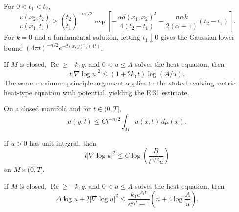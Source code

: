 \begin{theorem}
\label{thm:chow-ii-path-harnack}


For $0<t_1<t_2$,
\[
\frac{u(x_2,t_2)}{u(x_1,t_1)}\ge
\left(\frac{t_2}{t_1}\right)^{-\alpha n/2}
\exp\left[-\frac{\alpha d(x_1,x_2)^2}{4(t_2-t_1)}
-\frac{n\alpha k}{2(\alpha-1)}(t_2-t_1)\right].
\]
For $k=0$ and a fundamental solution, letting $t_1\downarrow0$ gives the
Gaussian lower bound $(4\pi t)^{-n/2}e^{-d(x,y)^2/(4t)}$.
\end{theorem}

\begin{theorem}
\label{thm:chow-ii-hamilton-gradient-estimate}

If $M$ is closed, $\operatorname{Rc}\ge-k_1g$, and $0<u\le A$ solves the
heat equation, then
\[
t|\nabla\log u|^2\le(1+2k_1t)\log(A/u).
\]
The same maximum-principle argument applies to the stated evolving-metric
heat-type equation with potential, yielding the E.31 estimate.
\end{theorem}

\begin{corollary}
\label{cor:chow-ii-heat-integral-pointwise}


On a closed manifold and for $t\in(0,T]$,
\[
u(y,t)\le Ct^{-n/2}\int_Mu(x,t)\,d\mu(x).
\]
\end{corollary}

\begin{corollary}
\label{cor:chow-ii-heat-gradient-integral}


If $u>0$ has unit integral, then
\[
t|\nabla\log u|^2\le C\log\left(\frac{B}{t^{n/2}u}\right)
\]
on $M\times(0,T]$.
\end{corollary}

\begin{theorem}
\label{thm:chow-ii-heat-laplacian-estimate}

If $M$ is closed, $\operatorname{Rc}\ge-k_1g$, and $0<u\le A$ solves the heat
equation, then
\[
\Delta\log u+2|\nabla\log u|^2
\le\frac{k_1e^{k_1t}}{e^{k_1t}-1}
\left(n+4\log\frac Au\right).
\]
\end{theorem}
